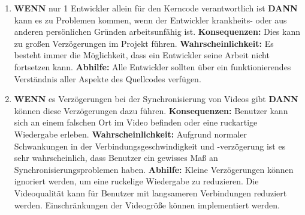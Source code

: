 \begin{enumerate}
    \item
    \textbf{WENN} nur 1 Entwickler allein für den Kerncode verantwortlich ist \textbf{DANN} kann es zu Problemen kommen, wenn der Entwickler krankheits- oder aus anderen persönlichen Gründen arbeitsunfähig ist. 
    \linebreak
    \linebreak
    \textbf{Konsequenzen:}
    Dies kann zu großen Verzögerungen im Projekt führen.
    \linebreak
    \linebreak
    \textbf{Wahrscheinlichkeit:} Es besteht immer die Möglichkeit, dass ein Entwickler seine Arbeit nicht fortsetzen kann.
    \linebreak
    \linebreak
    \textbf{Abhilfe:} Alle Entwickler sollten über ein funktionierendes Verständnis aller Aspekte des Quellcodes verfügen.
    \linebreak

    \item
    \textbf{WENN} es Verzögerungen bei der Synchronisierung von Videos gibt \textbf{DANN} können diese Verzögerungen dazu führen.
    \linebreak
    \linebreak
    \textbf{Konsequenzen:} Benutzer kann sich an einem falschen Ort im Video befinden oder eine ruckartige Wiedergabe erleben.
    \linebreak
    \linebreak
    \textbf{Wahrscheinlichkeit:} Aufgrund normaler Schwankungen in der Verbindungsgeschwindigkeit und -verzögerung ist es sehr wahrscheinlich, dass Benutzer ein gewisses Maß an Synchronisierungsproblemen haben.
    \linebreak
    \linebreak
    \textbf{Abhilfe:}  Kleine Verzögerungen können ignoriert werden, um eine ruckelige Wiedergabe zu reduzieren. Die Videoqualität kann für Benutzer mit langsameren Verbindungen reduziert werden. Einschränkungen der Videogröße können implementiert werden.
    \linebreak
    

\end{enumerate}
